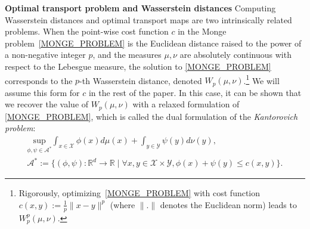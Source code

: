 \documentclass[runningheads]{llncs}
\begin{document}
\noindent \textbf{Optimal transport problem and Wasserstein distances} Computing Wasserstein distances and optimal transport maps are two intrinsically related problems. 
When the point-wise cost function $c$ in the Monge problem~\eqref{MONGE_PROBLEM} is the Euclidean distance raised to the power of a non-negative integer $p$, and the measures $\mu,\nu$ are absolutely continuous with respect to the Lebesgue measure, the solution to \eqref{MONGE_PROBLEM} corresponds to the $p$-th Wasserstein distance, denoted $W_p(\mu,\nu)$.\footnote{Rigorously, optimizing~\eqref{MONGE_PROBLEM} with cost function $c(x,y):=\frac{1}{p}\|x-y\|^p$ (where $\|.\|$ denotes the Euclidean norm) leads to $W_p^p(\mu,\nu)$.}
We will assume this form for $c$ in the rest of the paper. In this case, it can be shown that we recover the value of $W_p(\mu, \nu)$ with a relaxed formulation of \eqref{MONGE_PROBLEM}, which is called the dual formulation of the \textit{Kantorovich problem}:
\begin{gather}
\underset{\phi,\psi \in \mathcal{A}^* }{\text{sup}}
 \int_{ x \in \mathcal{X}} \phi(x) d\mu(x) + \int_{ y \in \mathcal{Y}} \psi(y) d\nu(y), \nonumber\\
\mathcal{A}^*:= 
\{(\phi,\psi): \mathds{R}^d\rightarrow \mathds{R} \mid
\forall x,y  \in \mathcal{X}\times \mathcal{Y},
 \phi(x)+\psi(y) \leqslant c(x,y)\}.
   \label{KANTOROVITCH_DUAL}
\end{gather}
\end{document}
